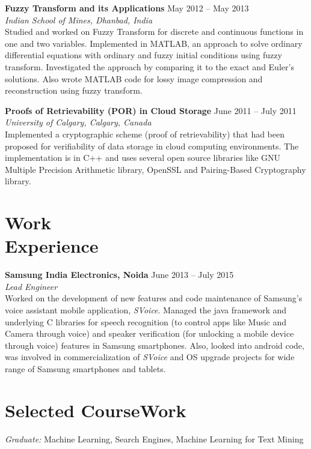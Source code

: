 \documentclass[margin,line]{resume}
\begin{document}
\begin{resume}
		\textbf{Fuzzy Transform and its Applications} \hfill May 2012 -- May 2013 \\
  		\textit{Indian School of Mines, Dhanbad, India} \\
		Studied and worked on Fuzzy Transform for discrete and continuous functions in one and two \mbox{variables}. Implemented in MATLAB, an approach to solve ordinary differential equations with 						\mbox{ordinary} and fuzzy initial conditions using fuzzy transform. Investigated the approach by comparing it to the exact and Euler's solutions. Also wrote MATLAB code for lossy image compression and reconstruction using fuzzy transform.

		\textbf{Proofs of Retrievability (POR) in Cloud Storage} \hfill June 2011 -- July 2011 \\
		\textit{University of Calgary, Calgary, Canada} \\
		Implemented a cryptographic scheme (proof of retrievability) that had been proposed for verifiability of data storage in cloud computing environments. The implementation is in C++ and uses several open 				source libraries like GNU Multiple Precision Arithmetic library, OpenSSL and Pairing-Based Cryptography library. 


\section{\mysidestyle Work\\Experience}
    		\textbf{Samsung India Electronics, Noida} \hfill June 2013 -- July 2015\\
		\textit{Lead Engineer}\\
		 Worked on the development of new features and code maintenance of Samsung's voice assistant mobile application, \textit{SVoice}. Managed the java framework and underlying C libraries for speech recognition (to control apps like Music and Camera through voice) and speaker verification (for unlocking a mobile device through voice) features in Samsung smartphones. Also, looked into android code, was involved in \mbox{commercialization} of \textit{SVoice} and OS upgrade projects for wide range of Samsung smartphones and tablets.


\section{\mysidestyle Selected CourseWork}
	
		\textit{Graduate: }Machine Learning, Search Engines, Machine Learning for Text Mining


\end{resume}
\end{document}
